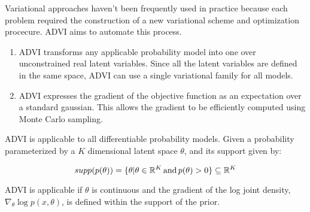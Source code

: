 \documentclass[12pt]{article}
\begin{document}
Variational approaches haven't been frequently used in practice because each problem required the construction of a new
variational scheme and optimization procecure. ADVI aims to automate this process. 

\begin{enumerate}
  \item ADVI transforms any applicable probability model into one over unconstrained real latent variables. Since all the 
  latent variables are defined in the same space, ADVI can use a single variational family for all models. 
  \item ADVI expresses the gradient of the objective function as an expectation over a standard gaussian. This allows
  the gradient to be efficiently computed using Monte Carlo sampling. 
\end{enumerate}

ADVI is applicable to all differentiable probability models. Given a probability parameterized by a $K$ dimensional 
latent space $\theta$, and its support given by:

\begin{equation}
  supp(p(\theta)) = \{\theta | \theta \in \mathbb{R}^K \, \text{and} \, p(\theta) > 0 \} \subseteq \mathbb{R} ^ K \notag
\end{equation}

ADVI is applicable if $\theta$ is continuous and the gradient of the log joint density, $\nabla_{\theta}\log p(x, \theta)$, 
is defined within the support of the prior.
\end{document}
